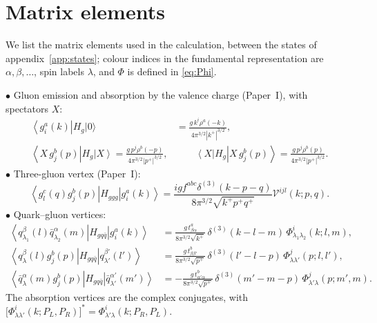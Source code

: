 \documentclass[11pt,a4paper]{article}
\numberwithin{equation}{section}
\newcommand{\dthree}{\delta^{(3)}}
\newcommand{\ket}[1]{\left|#1\right\rangle}
\newcommand{\bra}[1]{\left\langle#1\right|}
\newcommand{\vac}{|0\rangle}
\newcommand{\Ph}{\Phi}
\newcommand{\Vg}{\mathcal{V}}
\newcommand{\qk}[3]{q^{#1}_{#2}(#3)}
\newcommand{\aqk}[3]{\bar q^{#1}_{#2}(#3)}
\newcommand{\gl}[3]{g^{#1}_{#2}(#3)}
\begin{document}
\section{Matrix elements}
\label{app:me}

We list the matrix elements used in the calculation, between the states of
appendix~\ref{app:states}; colour indices in the fundamental representation are $\alpha,\beta,\dots$,
spin labels $\lambda$, and $\Ph$ is defined in \eqref{eq:Phi}.

\noindent$\bullet$ Gluon emission and absorption by the valence charge (Paper~I), with spectators $X$:
{\small\begin{align}
\bra{\gl{a}{i}{k}}H_{g}\vac&=\frac{g\,k^{i}\rho^{a}(-k)}{4\pi^{3/2}|k^{+}|^{3/2}},
\label{eq:MEg}\\
\bra{X\,\gl{b}{j}{p}}H_{g}\ket{X}=\frac{g\,p^{j}\rho^{b}(-p)}{4\pi^{3/2}|p^{+}|^{3/2}},&\qquad
\bra{X}H_{g}\ket{X\,\gl{b}{j}{p}}=\frac{g\,p^{j}\rho^{b}(p)}{4\pi^{3/2}|p^{+}|^{3/2}} .
\label{eq:MEg2}
\end{align}}
$\bullet$ Three-gluon vertex (Paper~I):
{\small\begin{equation}
\bra{\gl{c}{l}{q}\gl{b}{j}{p}}H_{ggg}\ket{\gl{a}{i}{k}}=
\frac{igf^{abc}\dthree(k-p-q)}{8\pi^{3/2}\sqrt{k^{+}p^{+}q^{+}}}\Vg^{ijl}(k;p,q).
\label{eq:MEggg}
\end{equation}}
$\bullet$ Quark--gluon vertices:
{\small\begin{align}
\bra{\qk{\beta}{\lambda_{1}}{l}\aqk{\alpha}{\lambda_{2}}{m}}H_{gq\bar q}\ket{\gl{a}{i}{k}}&=
\tfrac{g\,t^{a}_{\beta\alpha}}{8\pi^{3/2}\sqrt{k^{+}}}\,\dthree(k-l-m)\,\Ph^{i}_{\lambda_{1}\lambda_{2}}(k;l,m),
\label{eq:MEqqg}\\
\bra{\qk{\beta}{\lambda}{l}\gl{b}{j}{p}}H_{gq\bar q}\ket{\qk{\beta'}{\lambda'}{l'}}&=
\tfrac{g\,t^{b}_{\beta\beta'}}{8\pi^{3/2}\sqrt{p^{+}}}\,\dthree(l'-l-p)\,\Ph^{j}_{\lambda\lambda'}(p;l,l'),
\label{eq:MEqg}\\
\bra{\aqk{\alpha}{\lambda}{m}\gl{b}{j}{p}}H_{gq\bar q}\ket{\aqk{\alpha'}{\lambda'}{m'}}&=
-\tfrac{g\,t^{b}_{\alpha'\alpha}}{8\pi^{3/2}\sqrt{p^{+}}}\,\dthree(m'-m-p)\,\Ph^{j}_{\lambda'\lambda}(p;m',m).
\label{eq:MEaqg}
\end{align}}
The absorption vertices are the complex conjugates, with
$\big[\Ph^{i}_{\lambda\lambda'}(k;P_{L},P_{R})\big]^{*}=\Ph^{i}_{\lambda'\lambda}(k;P_{R},P_{L})$.
\end{document}
